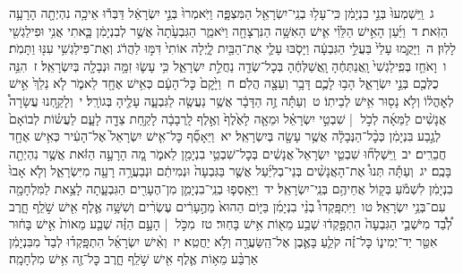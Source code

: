 \documentclass[18pt]{article}
\newcommand{\kri}[1]{\Afootnote{#1}}	%
\begin{document}
 {\loc ג~}וַֽיִּשְׁמְעוּ֙ בְּנֵ֣י בִנְיָמִ֔ן כִּֽי־עָל֥וּ בְנֵֽי־יִשְׂרָאֵ֖ל הַמִּצְפָּ֑ה וַיֹּֽאמְרוּ֙ בְּנֵ֣י יִשְׂרָאֵ֔ל דַּבְּר֕וּ אֵיכָ֥ה נִהְיְתָ֖ה הָרָעָ֥ה הַזֹּֽאת׃ \startlock
 {\loc ד~}וַיַּ֜עַן הָאִ֣ישׁ הַלֵּוִ֗י אִ֛ישׁ הָאִשָּׁ֥ה הַנִּרְצָחָ֖ה וַיֹּאמַ֑ר הַגִּבְעָ֙תָה֙ אֲשֶׁ֣ר לְבִנְיָמִ֔ן בָּ֛אתִי אֲנִ֥י וּפִילַגְשִׁ֖י לָלֽוּן׃ \startlock
 {\loc ה~}וַיָּקֻ֤מוּ עָלַי֙ בַּעֲלֵ֣י הַגִּבְעָ֔ה וַיָּסֹ֧בּוּ עָלַ֛י אֶת־הַבַּ֖יִת לָ֑יְלָה אוֹתִי֙ דִּמּ֣וּ לַהֲרֹ֔ג וְאֶת־פִּילַגְשִׁ֥י עִנּ֖וּ וַתָּמֹֽת׃ \startlock
 {\loc ו~}וָאֹחֵ֤ז בְּפִֽילַגְשִׁי֙ וָֽאֲנַתְּחֶ֔הָ וָֽאֲשַׁלְּחֶ֔הָ בְּכׇל־שְׂדֵ֖ה נַחֲלַ֣ת יִשְׂרָאֵ֑ל כִּ֥י עָשׂ֛וּ זִמָּ֥ה וּנְבָלָ֖ה בְּיִשְׂרָאֵֽל׃ \startlock
 {\loc ז~}הִנֵּ֥ה כֻלְּכֶ֖ם בְּנֵ֣י יִשְׂרָאֵ֑ל הָב֥וּ לָכֶ֛ם דָּבָ֥ר וְעֵצָ֖ה הֲלֹֽם׃ \startlock
 {\loc ח~}וַיָּ֙קׇם֙ כׇּל־הָעָ֔ם כְּאִ֥ישׁ אֶחָ֖ד לֵאמֹ֑ר לֹ֤א נֵלֵךְ֙ אִ֣ישׁ  לְאׇהֳל֔וֹ  וְלֹ֥א נָס֖וּר אִ֥ישׁ לְבֵיתֽוֹ׃ \startlock
 {\loc ט~}וְעַתָּ֕ה זֶ֣ה הַדָּבָ֔ר אֲשֶׁ֥ר נַעֲשֶׂ֖ה לַגִּבְעָ֑ה עָלֶ֖יהָ בְּגוֹרָֽל׃ \startlock
 {\loc י~}וְלָקַ֣חְנוּ עֲשָׂרָה֩ אֲנָשִׁ֨ים לַמֵּאָ֜ה לְכֹ֣ל  |  שִׁבְטֵ֣י יִשְׂרָאֵ֗ל וּמֵאָ֤ה לָאֶ֙לֶף֙ וְאֶ֣לֶף לָֽרְבָבָ֔ה לָקַ֥חַת צֵדָ֖ה לָעָ֑ם לַעֲשׂ֗וֹת לְבוֹאָם֙ לְגֶ֣בַע בִּנְיָמִ֔ן כְּכׇ֨ל־הַנְּבָלָ֔ה אֲשֶׁ֥ר עָשָׂ֖ה בְּיִשְׂרָאֵֽל׃ \startlock
 {\loc יא~}וַיֵּאָסֵ֞ף כׇּל־אִ֤ישׁ יִשְׂרָאֵל֙ אֶל־הָעִ֔יר כְּאִ֥ישׁ אֶחָ֖ד חֲבֵרִֽים׃ \startlock
 {\loc יב~}וַֽיִּשְׁלְח֞וּ שִׁבְטֵ֤י יִשְׂרָאֵל֙ אֲנָשִׁ֔ים בְּכׇל־שִׁבְטֵ֥י בִנְיָמִ֖ן לֵאמֹ֑ר מָ֚ה הָרָעָ֣ה הַזֹּ֔את אֲשֶׁ֥ר נִהְיְתָ֖ה בָּכֶֽם׃ \startlock
 {\loc יג~}וְעַתָּ֡ה תְּנוּ֩ אֶת־הָאֲנָשִׁ֨ים בְּנֵי־בְלִיַּ֜עַל אֲשֶׁ֤ר בַּגִּבְעָה֙ וּנְמִיתֵ֔ם וּנְבַעֲרָ֥ה רָעָ֖ה מִיִּשְׂרָאֵ֑ל וְלֹ֤א אָבוּ֙  \edtext{( )}{\kri{קרי ולא כתיב: [בְּנֵ֣י]}}  בִנְיָמִ֔ן לִשְׁמֹ֕עַ בְּק֖וֹל אֲחֵיהֶ֥ם בְּנֵֽי־יִשְׂרָאֵֽל׃ \startlock
 {\loc יד~}וַיֵּאָֽסְפ֧וּ בְנֵֽי־בִנְיָמִ֛ן מִן־הֶעָרִ֖ים הַגִּבְעָ֑תָה לָצֵ֥את לַמִּלְחָמָ֖ה עִם־בְּנֵ֥י יִשְׂרָאֵֽל׃ \startlock
 {\loc טו~}וַיִּתְפָּֽקְדוּ֩ בְנֵ֨י בִנְיָמִ֜ן בַּיּ֤וֹם הַהוּא֙ מֵהֶ֣עָרִ֔ים עֶשְׂרִ֨ים וְשִׁשָּׁ֥ה אֶ֛לֶף אִ֖ישׁ שֹׁ֣לֵֽף חָ֑רֶב לְ֠בַ֠ד מִיֹּשְׁבֵ֤י הַגִּבְעָה֙ הִתְפָּ֣קְד֔וּ שְׁבַ֥ע מֵא֖וֹת אִ֥ישׁ בָּחֽוּר׃ \startlock
 {\loc טז~}מִכֹּ֣ל  |  הָעָ֣ם הַזֶּ֗ה שְׁבַ֤ע מֵאוֹת֙ אִ֣ישׁ בָּח֔וּר אִטֵּ֖ר יַד־יְמִינ֑וֹ כׇּל־זֶ֗ה קֹלֵ֧עַ בָּאֶ֛בֶן אֶל־הַֽשַּׂעֲרָ֖ה וְלֹ֥א יַחֲטִֽא׃ \startlock
 {\loc יז~}וְאִ֨ישׁ יִשְׂרָאֵ֜ל הִתְפָּֽקְד֗וּ לְבַד֙ מִבִּנְיָמִ֔ן אַרְבַּ֨ע מֵא֥וֹת אֶ֛לֶף אִ֖ישׁ שֹׁ֣לֵֽף חָ֑רֶב כׇּל־זֶ֖ה אִ֥ישׁ מִלְחָמָֽה׃ \startlock
\end{document}
